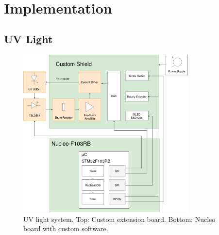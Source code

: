 
\chapter{Implementation}
\label{chap:implementation}

\section{UV Light}
\label{sec:uv_light}

\begin{figure}[H]                                                         
\centering          
\includegraphics[width=0.8\textwidth]{./fig/uv_light_block_diagram}   
\caption[UV light system.]{UV light system. Top: Custom extension board. Bottom: Nucleo board with custom software.}   
\label{fig:uv_light_block_diagram}                                                       
\end{figure}  

